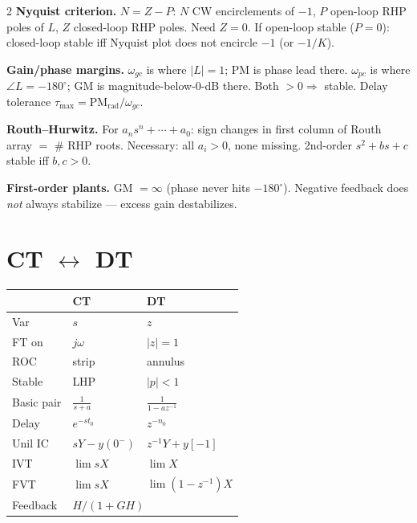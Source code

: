 \documentclass[11pt,landscape]{extarticle}
\begin{document}
\begin{paracol}{2}
\textbf{Nyquist criterion.} $N=Z-P$: $N$ CW encirclements of $-1$, $P$ open-loop RHP poles of $L$, $Z$ closed-loop RHP poles. Need $Z=0$. If open-loop stable ($P=0$): closed-loop stable iff Nyquist plot does not encircle $-1$ (or $-1/K$).

\textbf{Gain/phase margins.} $\omega_{gc}$ is where $|L|=1$; PM is phase lead there. $\omega_{pc}$ is where $\angle L=-180^\circ$; GM is magnitude-below-0-dB there. Both $>0 \Rightarrow$ stable. Delay tolerance $\tau_{\max}=\mathrm{PM}_\mathrm{rad}/\omega_{gc}$.

\textbf{Routh--Hurwitz.} For $a_n s^n+\cdots+a_0$: sign changes in first column of Routh array $=$ \# RHP roots. Necessary: all $a_i>0$, none missing. 2nd-order $s^2+bs+c$ stable iff $b,c>0$.

\textbf{First-order plants.} GM $=\infty$ (phase never hits $-180^\circ$). Negative feedback does \emph{not} always stabilize --- excess gain destabilizes.

\switchcolumn*

\section*{CT $\leftrightarrow$ DT}
\begin{tabular}{@{}l l l@{}}
\toprule
 & CT & DT \\
\midrule
Var & $s$ & $z$ \\
FT on & $j\omega$ & $|z|{=}1$ \\
ROC & strip & annulus \\
Stable & LHP & $|p|{<}1$ \\
Basic pair & $\tfrac{1}{s+a}$ & $\tfrac{1}{1-az^{-1}}$ \\
Delay & $e^{-st_0}$ & $z^{-n_0}$ \\
Unil IC & $sY{-}y(0^-)$ & $z^{-1}Y{+}y[-1]$ \\
IVT & $\lim\!sX$ & $\lim\!X$ \\
FVT & $\lim\!sX$ & $\lim(1{-}z^{-1})X$ \\
Feedback & \multicolumn{2}{l}{$H/(1{+}GH)$} \\
\bottomrule
\end{tabular}

\switchcolumn


\end{paracol}
\end{document}

